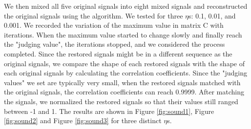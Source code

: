 \documentclass[UTF8,12pt]{article}
\begin{document}
	We then mixed all five original signals into eight mixed signals and reconstructed the original signals using the algorithm. We tested for three $\eta$s: 0.1, 0.01, and 0.001. We recorded the variation of the maximum value in matrix C with iterations. When the maximum value started to change slowly and finally reach the "judging value", the iterations stopped, and we considered the process completed. Since the restored signals might be in a different sequence as the original signals, we compare the shape of each restored signals with the shape of each original signals by calculating the correlation coefficients. Since the "judging values" we set are typically very small, when the restored signals matched with the original signals, the correlation coefficients can reach 0.9999. After matching the signals, we normalized the restored signals so that their values still ranged between -1 and 1. The results are shown in Figure \ref{fig:sound1}, Figure \ref{fig:sound2} and Figure \ref{fig:sound3} for three distinct $\eta$s.
\end{document}
